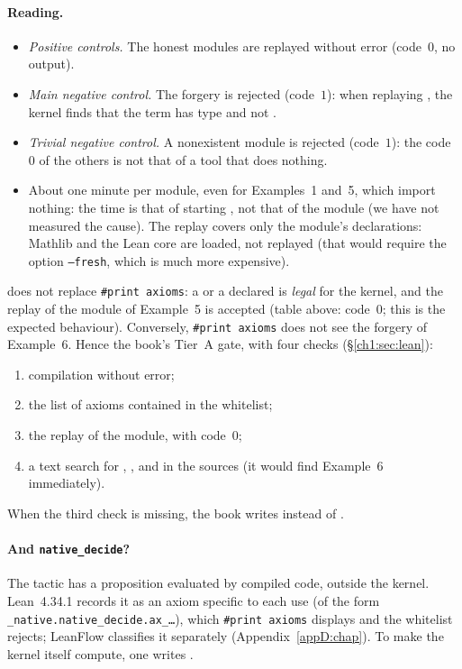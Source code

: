 \paragraph{Reading.}
\begin{itemize}
\item \emph{Positive controls.} The honest modules are replayed without error (code~$0$, no output).
\item \emph{Main negative control.} The forgery is rejected (code~$1$): when replaying , the kernel
finds that the term  has type  and not .
\item \emph{Trivial negative control.} A nonexistent module is rejected (code~$1$): the code~$0$ of the others is not
that of a tool that does nothing.
\item About one minute per module, even for Examples~1 and~5, which import nothing: the time is that of starting
, not that of the module (we have not measured the cause). The replay covers only the module's declarations: Mathlib and the Lean core are loaded, not
replayed (that would require the option \texttt{--fresh}, which is much more expensive).
\end{itemize}

\begin{warnbox}
 does not replace \texttt{\#print axioms}: a  or a declared  is
\emph{legal} for the kernel, and the replay of the module of Example~5 is accepted (table above: code~$0$; this is the
expected behaviour). Conversely, \texttt{\#print axioms} does not see the forgery of Example~6. Hence the book's Tier~A
gate, with four checks (§\ref{ch1:sec:lean}):
\begin{enumerate}
\item compilation without error;
\item the list of axioms contained in the whitelist;
\item the  replay of the module, with code~$0$;
\item a text search for , ,  and  in the
sources (it would find Example~6 immediately).
\end{enumerate}
When the third check is missing, the book writes \tierAs{} instead of \tierA.
\end{warnbox}

\paragraph{And \texttt{native\_decide}?} The tactic  has a proposition evaluated by compiled code,
outside the kernel. Lean~4.34.1 records it as an axiom specific to each use (of the form
\texttt{\_native.native\_decide.ax\_\dots}), which \texttt{\#print axioms} displays and the whitelist rejects; LeanFlow
classifies it separately (Appendix~\ref{appD:chap}). To make the kernel itself compute, one writes
.

